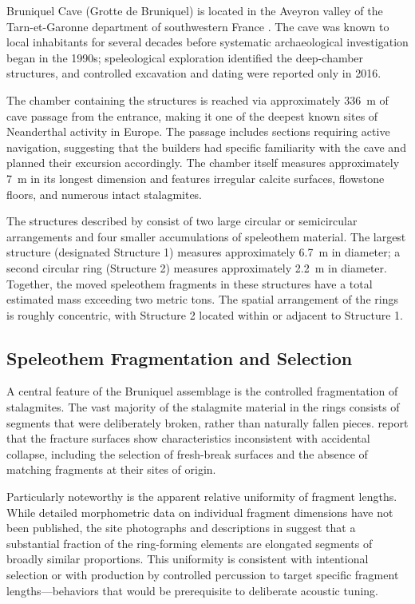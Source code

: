 \documentclass[12pt]{article}
\begin{document}
Bruniquel Cave (Grotte de Bruniquel) is located in the Aveyron valley of the Tarn-et-Garonne department of southwestern France \citep{Jaubert2016}. The cave was known to local inhabitants for several decades before systematic archaeological investigation began in the 1990s; speleological exploration identified the deep-chamber structures, and controlled excavation and dating were reported only in 2016.

The chamber containing the structures is reached via approximately 336~m of cave passage from the entrance, making it one of the deepest known sites of Neanderthal activity in Europe. The passage includes sections requiring active navigation, suggesting that the builders had specific familiarity with the cave and planned their excursion accordingly. The chamber itself measures approximately 7~m in its longest dimension and features irregular calcite surfaces, flowstone floors, and numerous intact stalagmites.

The structures described by \citet{Jaubert2016} consist of two large circular or semicircular arrangements and four smaller accumulations of speleothem material. The largest structure (designated Structure 1) measures approximately 6.7~m in diameter; a second circular ring (Structure 2) measures approximately 2.2~m in diameter. Together, the moved speleothem fragments in these structures have a total estimated mass exceeding two metric tons. The spatial arrangement of the rings is roughly concentric, with Structure 2 located within or adjacent to Structure 1.

\subsection{Speleothem Fragmentation and Selection}

A central feature of the Bruniquel assemblage is the controlled fragmentation of stalagmites. The vast majority of the stalagmite material in the rings consists of segments that were deliberately broken, rather than naturally fallen pieces. \citet{Jaubert2016} report that the fracture surfaces show characteristics inconsistent with accidental collapse, including the selection of fresh-break surfaces and the absence of matching fragments at their sites of origin.

Particularly noteworthy is the apparent relative uniformity of fragment lengths. While detailed morphometric data on individual fragment dimensions have not been published, the site photographs and descriptions in \citet{Jaubert2016} suggest that a substantial fraction of the ring-forming elements are elongated segments of broadly similar proportions. This uniformity is consistent with intentional selection or with production by controlled percussion to target specific fragment lengths—behaviors that would be prerequisite to deliberate acoustic tuning.
\end{document}
